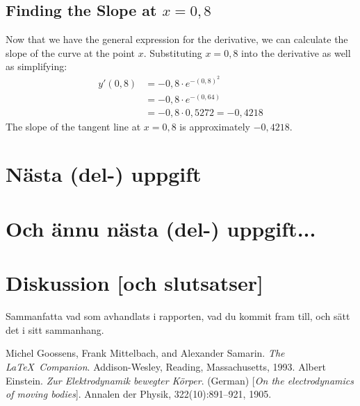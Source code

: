\documentclass[a4paper,12pt]{article}
\begin{document}
  \subsection{Finding the Slope at $x = 0,8$}
  Now that we have the general expression for the derivative, we can calculate the slope of the curve at the point $x$. Substituting $x = 0,8$ into the derivative as well as simplifying:
  \begin{equation}
    \begin{split}
      y'(0,8) & = -0,8 \cdot e^{-\left(0,8\right)^2} \\
              & = -0,8 \cdot e^{-\left(0,64\right)} \\
              & = -0,8 \cdot 0,5272 = -0,4218
    \end{split}
  \end{equation}
  The slope of the tangent line at $x = 0,8$ is approximately $-0,4218$.
  
\section{Nästa (del-) uppgift}
\label{sec:uppg2}

\section{Och ännu nästa (del-) uppgift...}
\label{sec:uppgN}

\section{Diskussion [och slutsatser]}
\label{sec:disk}

Sammanfatta vad som avhandlats i rapporten, vad du kommit fram till,
och sätt det i sitt sammanhang. 
%
\begin{thebibliography}{99}
%
Michel Goossens, Frank Mittelbach, and Alexander Samarin. 
\textit{The \LaTeX\ Companion}. 
Addison-Wesley, Reading, Massachusetts, 1993.
%
Albert Einstein. 
\textit{Zur Elektrodynamik bewegter K{\"o}rper}. (German) 
[\textit{On the electrodynamics of moving bodies}]. 
Annalen der Physik, 322(10):891–921, 1905.
%
\end{thebibliography}
%
\end{document}
